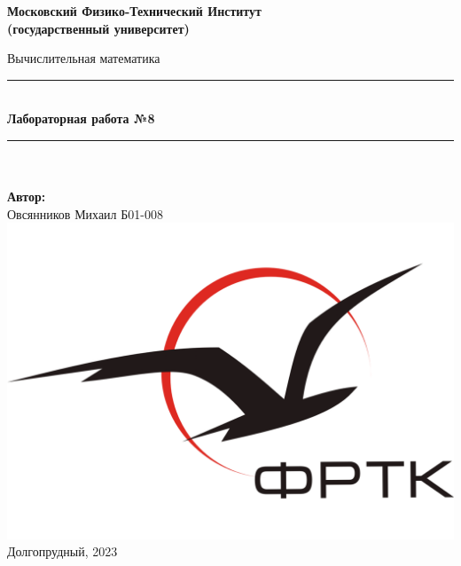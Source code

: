 \newcommand{\HRule}{\rule{\linewidth}{0.7mm}} %

\begin{center}
	\large\textbf{Московский Физико-Технический Институт}\\
	\large\textbf{(государственный университет)}
	
	\vfill
	

	
	\Large Вычислительная математика
	
	\HRule
	\\[0.4cm]
	{ \huge \bfseries Лабораторная работа №8}
	\\[0.4cm] %
	\HRule
	\\[0.5cm]
	
	\ \\
	\textbf{\large Автор:} \\	
	\large Овсянников Михаил Б01-008\\
	\vfill
	\hspace*{-0.8 cm}\includegraphics[width=100 pt]{./Include/frkt_logo.pdf}\\
	\large Долгопрудный, 2023
\end{center}

\thispagestyle{empty}

\newpage
\setcounter{page}{2}
\fancyfoot[c]{\thepage}
\fancyhead[R]{}
